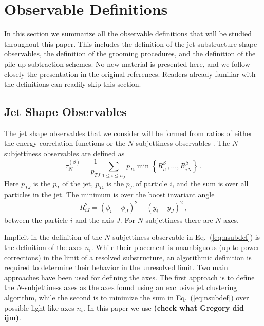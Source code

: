 \documentclass[11pt,letterpaper]{article}
\DeclareRobustCommand{\Eq}[1]{Eq.~(\ref{#1})}
\newcommand{\Nsub}[2]{\tau_{#1}^{(#2)}}
\newcommand{\ijm}[1]{\textbf{\textcolor{llblue}{(#1 --ijm)}}}
\begin{document}
\section{Observable Definitions}\label{sec:obs_def}

In this section we summarize all the observable definitions that will be studied throughout this paper. This includes the definition of the jet substructure shape observables, the definition of the grooming procedures, and the definition of the pile-up subtraction schemes.  No new material is presented here, and we follow closely the presentation in the original references. Readers already familiar with the definitions can readily skip this section.



\subsection{Jet Shape Observables}\label{sec:shape_def}

The jet shape observables that we consider will be formed from ratios of either the energy correlation functions \cite{Larkoski:2013eya,Moult:2016cvt} or the $N$-subjettiness observables \cite{Thaler:2010tr,Thaler:2011gf}.  The $N$-subjettiness observables are defined as \cite{Stewart:2010tn,Thaler:2010tr,Thaler:2011gf}
\begin{equation}\label{eq:nsubdef}
\Nsub{N}{\beta} = \frac{1}{p_{TJ}}\sum_{1\leq i \leq n_J} p_{Ti}\min\left\{
R_{i1}^\beta,\dotsc,R_{iN}^\beta
\right\} \ .
\end{equation}
Here $p_{TJ}$ is the $p_T$ of the jet,  $p_{Ti}$ is the $p_T$ of particle $i$, and the sum is over all particles in the jet. The minimum is over the boost invariant angle
\begin{align}\label{eq:ptratio}  
R_{iJ}^2 = (\phi_i-\phi_J)^2+(y_i-y_J)^2\,,
\end{align}
between the particle $i$ and the axis $J$. For $N$-subjettiness there are $N$ axes.

Implicit in the definition of the $N$-subjettiness observable in \Eq{eq:nsubdef} is the definition of the axes $n_i$. While their placement is unambiguous (up to power corrections) in the limit of a resolved substructure, an algorithmic definition is required to determine their behavior in the unresolved limit.  Two main approaches have been used for defining the axes. The first approach is to define the $N$-subjettiness axes as the axes found using an exclusive jet clustering algorithm, while
the second is to minimize the sum in \Eq{eq:nsubdef} over possible light-like axes $n_i$. In this paper we use \ijm{check what Gregory did}.
\end{document}
